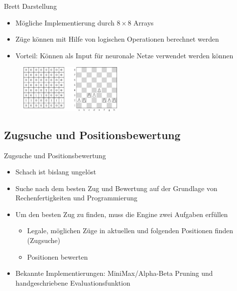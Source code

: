 \begin{frame}{Brett Darstellung}
\begin{itemize}
	\item Mögliche Implementierung durch $8 \times 8$ Arrays
	\item Züge können mit Hilfe von logischen Operationen berechnet werden
	\item Vorteil: Können als Input für neuronale Netze verwendet werden können
\end{itemize}
\begin{figure}
\centering
\includegraphics[width=0.45\textwidth]{graphics/bitboard/bitboard_and_chessboard.png}
\end{figure}
\end{frame}

\subsection{Zugsuche und Positionsbewertung}

\begin{frame}{Zugsuche und Positionsbewertung}
\begin{itemize}
	\item Schach ist bislang ungelöst
	\item Suche nach dem besten Zug und Bewertung auf der Grundlage von Rechenfertigkeiten und Programmierung
	\item Um den besten Zug zu finden, muss die Engine zwei Aufgaben erfüllen
	\begin{itemize}
		\item Legale, möglichen Züge in aktuellen und folgenden Positionen finden (Zugsuche)
		\item Positionen bewerten
	\end{itemize}
	\item Bekannte Implementierungen: MiniMax/Alpha-Beta Pruning und handgeschriebene Evaluationsfunktion
\end{itemize}
\end{frame}




